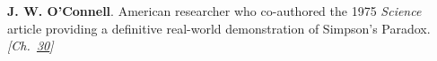 \textbf{J. W. O’Connell}. American researcher who co-authored the 1975 \emph{Science} article providing a definitive real-world demonstration of Simpson's Paradox. \emph{[Ch.~\hyperref[ch:simpsonsparadox]{30}]}

